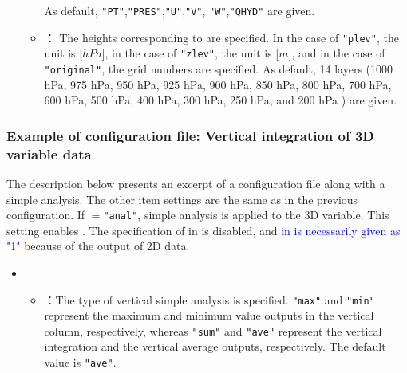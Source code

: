 \begin{itemize}
\begin{itemize}
    As default, \verb|"PT"|,\verb|"PRES"|,\verb|"U"|,\verb|"V"|, \verb|"W"|,\verb|"QHYD"| are given.
  \item {}： The heights corresponding to  are specified.
    In the case of \verb|"plev"|, the unit is [$hPa$],
    in the case of \verb|"zlev"|, the unit is [$m$], and
    in the case of \verb|"original"|, the grid numbers are specified.
    As default, 14 layers (1000 hPa, 975 hPa, 950 hPa, 925 hPa, 900 hPa, 850 hPa, 800 hPa, 700 hPa, 600 hPa, 500 hPa, 400 hPa,
        300 hPa, 250 hPa, and 200 hPa ) are given.
 \end{itemize}
\end{itemize}

\subsubsection{Example of configuration file: Vertical integration of 3D variable data}
The description below presents an excerpt of a configuration file along with a simple analysis.
The other item settings are the same as in the previous configuration.
If $=$\verb|"anal"|, simple analysis is applied to the 3D variable.
This setting enables .
The specification of  in  is disabled,
and \textcolor{blue}{ in  is necessarily given as "1"}
because of the output of 2D data.
\begin{itemize}
 \item {}
 \begin{itemize}
  \item {}：The type of vertical simple analysis is specified. \verb|"max"| and \verb|"min"|
    represent the maximum and minimum value outputs in the vertical column, respectively, whereas \verb|"sum"| and \verb|"ave"| represent
    the vertical integration and the vertical average outputs, respectively. The default value is \verb|"ave"|.
 \end{itemize}
\end{itemize}

